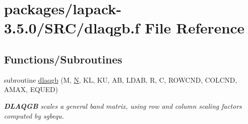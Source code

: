 \hypertarget{dlaqgb_8f}{}\section{packages/lapack-\/3.5.0/\+S\+R\+C/dlaqgb.f File Reference}
\label{dlaqgb_8f}
\subsection*{Functions/\+Subroutines}
\begin{DoxyCompactItemize}
\item 
subroutine \hyperlink{group__doubleGBauxiliary_gad33336cd27dd6f289effc58cf9e88673}{dlaqgb} (M, \hyperlink{polmisc_8c_a0240ac851181b84ac374872dc5434ee4}{N}, K\+L, K\+U, A\+B, L\+D\+A\+B, R, C, R\+O\+W\+C\+N\+D, C\+O\+L\+C\+N\+D, A\+M\+A\+X, E\+Q\+U\+E\+D)
\begin{DoxyCompactList}\small\item\em {\bfseries D\+L\+A\+Q\+G\+B} scales a general band matrix, using row and column scaling factors computed by sgbequ. \end{DoxyCompactList}\end{DoxyCompactItemize}
